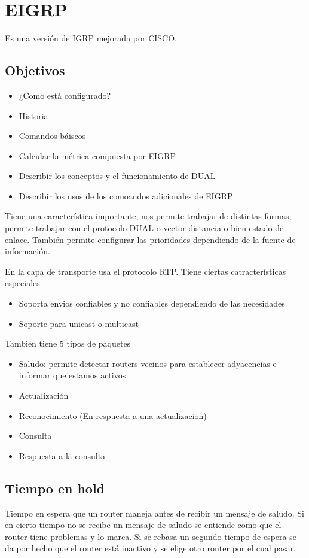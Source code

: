 \chapter{EIGRP}
Es una versión de IGRP mejorada por CISCO. 

\section{Objetivos}
\begin{itemize}
    \item ¿Como está configurado? 
    \item Historia 
    \item Comandos báiscos 
    \item Calcular la métrica compuesta por EIGRP 
    \item Describir los conceptos y el funcionamiento de DUAL 
    \item Describir los usos de los comoandos adicionales de EIGRP
\end{itemize}

Tiene una característica importante, nos permite trabajar de distintas formas, permite trabajar con el protocolo DUAL o vector distancia o bien estado de enlace. También permite configurar las prioridades dependiendo de la fuente de información. 

En la capa de transporte usa el protocolo RTP. Tiene ciertas catracterísticas especiales 
\begin{itemize}
    \item {Soporta envios confiables y no confiables dependiendo de las necesidades}
    \item {Soporte para unicast o multicast}
\end{itemize}

También tiene 5 tipos de paquetes 
\begin{itemize}
    \item Saludo: permite detectar routers vecinos para establecer adyacencias e informar que estamos activos
    \item Actualización 
    \item Reconocimiento (En respuesta a una actualizacion)
    \item Consulta 
    \item Respuesta a la consulta
\end{itemize}

\section{Tiempo en hold }
Tiempo en espera que un router maneja antes de recibir un mensaje de saludo. Si en cierto tiempo no se recibe un mensaje de saludo se entiende como que el router tiene problemas y lo marca. Si se rebasa un segundo tiempo de espera se da por hecho que el router está inactivo y se elige otro router por el cual pasar.    